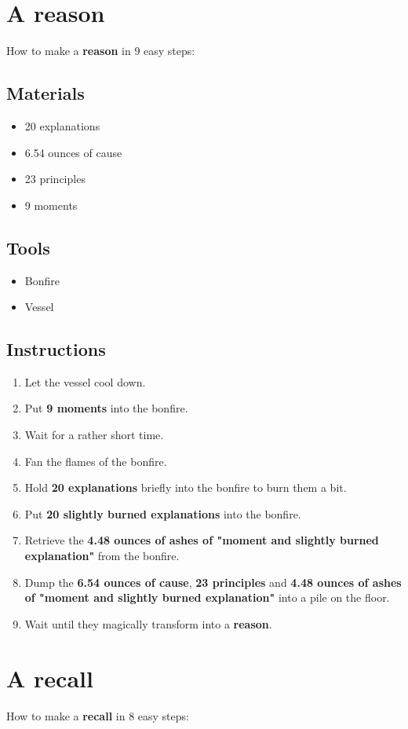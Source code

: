\documentclass{article}
\begin{document}
\section{A reason}How to make a \textbf{reason} in 9 easy steps:

\subsection{Materials}\begin{itemize}
\item 
20 explanations
\item 
6.54 ounces of cause
\item 
23 principles
\item 
9 moments
\end{itemize}
\subsection{Tools}\begin{itemize}
\item 
Bonfire
\item 
Vessel
\end{itemize}
\subsection{Instructions}\begin{enumerate}
\item 
Let the vessel cool down.
\item 
Put \textbf{9 moments} into the bonfire.
\item 
Wait for a rather short time.
\item 
Fan the flames of the bonfire.
\item 
Hold \textbf{20 explanations} briefly into the bonfire to burn them a bit.
\item 
Put \textbf{20 slightly burned explanations} into the bonfire.
\item 
Retrieve the \textbf{4.48 ounces of ashes of "moment and slightly burned explanation"} from the bonfire.
\item 
Dump the \textbf{6.54 ounces of cause}, \textbf{23 principles} and \textbf{4.48 ounces of ashes of "moment and slightly burned explanation"} into a pile on the floor.
\item 
Wait until they magically transform into a \textbf{reason}.
\end{enumerate}
\newpage
\section{A recall}How to make a \textbf{recall} in 8 easy steps:
\end{document}
